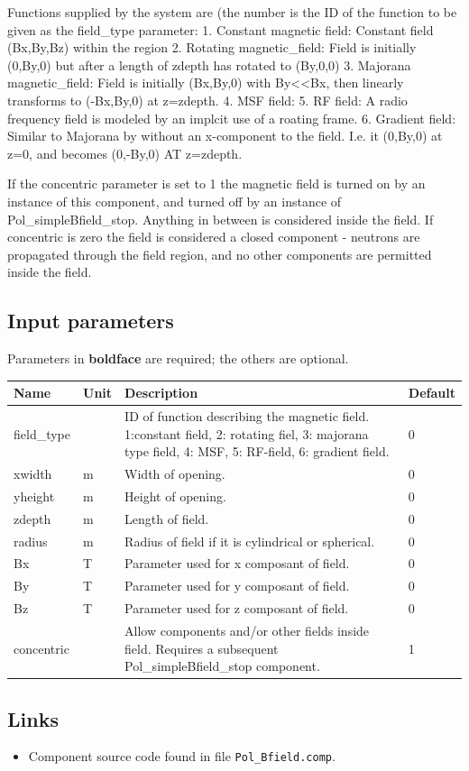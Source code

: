 Functions supplied by the system are (the number is the ID of the function to be given as the field\_type parameter: 1. Constant magnetic field: Constant field (Bx,By,Bz) within the region 2. Rotating magnetic\_field: Field is initially (0,By,0) but after a length of zdepth has rotated to (By,0,0) 3. Majorana magnetic\_field: Field is initially (Bx,By,0) with By\textless{}\textless{}Bx, then linearly transforms to (-Bx,By,0) at z=zdepth. 4. MSF field: 5. RF field: A radio frequency field is modeled by an implcit use of a roating frame. 6. Gradient field: Similar to Majorana by without an x-component to the field. I.e. it (0,By,0) at z=0, and becomes (0,-By,0) AT z=zdepth.

If the concentric parameter is set to 1 the magnetic field is turned on by an instance of this component, and turned off by an instance of Pol\_simpleBfield\_stop. Anything in between is considered inside the field. If concentric is zero the field is considered a closed component - neutrons are propagated through the field region, and no other components are permitted inside the field.

\subsection*{Input parameters}
Parameters in \textbf{boldface} are required; the others are optional.

\begin{longtable}{p{}p{}p{}p{}}
\toprule
\textbf{Name} & \textbf{Unit} & \textbf{Description} & \textbf{Default} \\
\midrule
\endhead
field\_type &  & ID of function describing the magnetic field. 1:constant field, 2: rotating fiel, 3: majorana type field, 4: MSF, 5: RF-field, 6: gradient field. & 0 \\
xwidth & m & Width of opening. & 0 \\
yheight & m & Height of opening. & 0 \\
zdepth & m & Length of field. & 0 \\
radius & m & Radius of field if it is cylindrical or spherical. & 0 \\
Bx & T & Parameter used for x composant of field. & 0 \\
By & T & Parameter used for y composant of field. & 0 \\
Bz & T & Parameter used for z composant of field. & 0 \\
concentric &   & Allow components and/or other fields inside field. Requires a subsequent Pol\_simpleBfield\_stop component. & 1 \\
\bottomrule
\end{longtable}

\subsection*{Links}
\begin{itemize}
  \item Component source code found in file \texttt{Pol\_Bfield.comp}.
\end{itemize}
